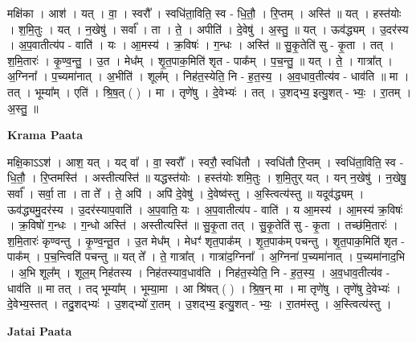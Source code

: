 \documentclass[17pt]{extarticle}
\begin{document}
मक्षि॑का । आश॑ । यत् । वा॒ । स्वरौ᳚ । स्वधि॑ता॒विति॒ स्व - धि॒तौ॒ । रि॒प्तम् । अस्ति॑ ॥ यत् । हस्त॑योः । श॒मि॒तुः । यत् । न॒खेषु॑ । सर्वा᳚ । ता । ते॒ । अपीति॑ । दे॒वेषु॑ । अ॒स्तु॒ ॥ यत् । ऊव॑द्ध्यम् । उ॒दर॑स्य । अ॒प॒वातीत्य॑प - वाति॑ । यः । आ॒मस्य॑ । क्र॒विषः॑ । ग॒न्धः । अस्ति॑ ॥ सु॒कृ॒तेति॑ सु - कृ॒ता । तत् । श॒मि॒तारः॑ । कृ॒ण्व॒न्तु॒ । उ॒त । मेध᳚म् । शृ॒त॒पाक॒मिति॑ शृत - पाक᳚म् । प॒च॒न्तु॒ ॥ यत् । ते॒ । गात्रा᳚त् । अ॒ग्निना᳚ । प॒च्यमा॑नात् । अ॒भीति॑ । शूल᳚म् । निह॑त॒स्येति॒ नि - ह॒त॒स्य॒ । अ॒व॒धाव॒तीत्य॑व - धाव॑ति ॥ मा । तत् । भूम्या᳚म् । एति॑ । श्रि॒ष॒त् ( ) । मा । तृणे॑षु । दे॒वेभ्यः॑ । तत् । उ॒शद्भ्य॒ इत्यु॒शत् - भ्यः॒ । रा॒तम् । अ॒स्तु॒ ॥  \newline


\textbf{Krama Paata} \newline

मक्षि॒काऽऽश॑ । आश॒ यत् । यद् वा᳚ । वा॒ स्वरौ᳚ । स्वरौ॒ स्वधि॑तौ । स्वधि॑तौ रि॒प्तम् । स्वधि॑ता॒विति॒ स्व - धि॒तौ॒ । रि॒प्तमस्ति॑ । अस्तीत्यस्ति॑ ॥ यद्धस्त॑योः । हस्त॑योः शमि॒तुः । श॒मि॒तुर् यत् । यन् न॒खेषु॑ । न॒खेषु॒ सर्वा᳚ । सर्वा॒ ता । ता ते᳚ । ते॒ अपि॑ । अपि॑ दे॒वेषु॑ । दे॒वेष्व॑स्तु । अ॒स्त्वित्य॑स्तु ॥ यदूव॑द्ध्यम् । ऊव॑द्ध्यमु॒दर॑स्य । उ॒दर॑स्याप॒वाति॑ । अ॒प॒वाति॒ यः । अ॒प॒वातीत्य॑प - वाति॑ । य आ॒मस्य॑ । आ॒मस्य॑ क्र॒विषः॑ । क्र॒विषो॑ ग॒न्धः । ग॒न्धो अस्ति॑ । अस्तीत्यस्ति॑ ॥ सु॒कृ॒ता तत् । सु॒कृ॒तेति॑ सु - कृ॒ता । तच्छ॑मि॒तारः॑ । श॒मि॒तारः॑ कृण्वन्तु । कृ॒ण्व॒न्तू॒त । उ॒त मेध᳚म् । मेधꣳ॑ शृत॒पाक᳚म् । शृ॒त॒पाक॑म् पचन्तु । शृ॒त॒पाक॒मिति॑ शृत - पाक᳚म् । प॒च॒न्त्विति॑ पचन्तु ॥ यत् ते᳚ । ते॒ गात्रा᳚त् । गात्रा॑द॒ग्निना᳚ । अ॒ग्निना॑ प॒च्यमा॑नात् । प॒च्यमा॑नाद॒भि । अ॒भि शूल᳚म् । शूल॒म् निह॑तस्य । निह॑तस्याव॒धाव॑ति । निह॑त॒स्येति॒ नि - ह॒त॒स्य॒ । अ॒व॒धाव॒तीत्य॑व - धाव॑ति ॥ मा तत् । तद् भूम्या᳚म् । भूम्या॒मा । आ श्रि॑षत् ( ) । श्रि॒ष॒न् मा । मा तृणे॑षु । तृणे॑षु दे॒वेभ्यः॑ । दे॒वेभ्य॒स्तत् । तदु॒शद्भ्यः॑ । उ॒शद्भ्यो॑ रा॒तम् । उ॒शद्भ्य॒ इत्यु॒शत् - भ्यः॒ । रा॒तम॑स्तु । अ॒स्त्वित्य॑स्तु । \newline

\textbf{Jatai Paata} \newline
\end{document}
